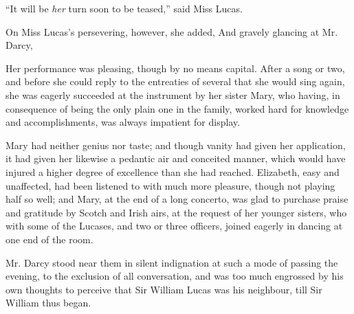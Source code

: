 
“It will be {\em her} turn soon to be teased,” said Miss Lucas. 

 On Miss Lucas's persevering, however, she added,  And gravely glancing at Mr. Darcy, 

Her performance was pleasing, though by no means capital. After a song or two, and before she could reply to the entreaties of several that she would sing again, she was eagerly succeeded at the instrument by her sister Mary, who having, in consequence of being the only plain one in the family, worked hard for knowledge and accomplishments, was always impatient for display.

Mary had neither genius nor taste; and though vanity had given her application, it had given her likewise a pedantic air and conceited manner, which would have injured a higher degree of excellence than she had reached. Elizabeth, easy and unaffected, had been listened to with much more pleasure, though not playing half so well; and Mary, at the end of a long concerto, was glad to purchase praise and gratitude by Scotch and Irish airs, at the request of her younger sisters, who with some of the Lucases, and two or three officers, joined eagerly in dancing at one end of the room.

Mr. Darcy stood near them in silent indignation at such a mode of passing the evening, to the exclusion of all conversation, and was too much engrossed by his own thoughts to perceive that Sir William Lucas was his neighbour, till Sir William thus began.




